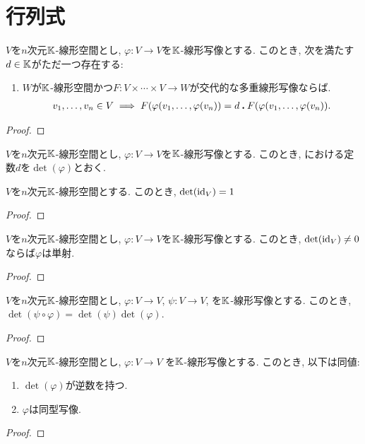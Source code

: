 \section{行列式}

\begin{prop}
  \label{thm:universalprop:det}
  $V$を$n$次元$\mathbb{K}$-線形空間とし,
  $\varphi\colon V \to V$を$\mathbb{K}$-線形写像とする.
  このとき, 次を満たす$d\in\mathbb{K}$がただ一つ存在する:
  \begin{enumerate}
  \item $W$が$\mathbb{K}$-線形空間かつ$F\colon V\times\cdots \times V\to W$が交代的な多重線形写像ならば.
    \begin{align*}
      v_1,\ldots, v_n \in V\implies F(\varphi(v_1,\ldots,\varphi(v_n))=d \mathbin{\boldsymbol{.}} F(\varphi(v_1,\ldots,\varphi(v_n)).
    \end{align*}
  \end{enumerate}
\end{prop}
\begin{proof}\end{proof}

\begin{definition}
  $V$を$n$次元$\mathbb{K}$-線形空間とし,
  $\varphi\colon V \to V$を$\mathbb{K}$-線形写像とする.
  このとき,
  における定数$d$を$\det(\varphi)$とおく.
\end{definition}

\begin{prop}
  $V$を$n$次元$\mathbb{K}$-線形空間とする.
  このとき, $\det(\operatorname{id}_V)=1$
\end{prop}
\begin{proof}\end{proof}

\begin{lemma}
  $V$を$n$次元$\mathbb{K}$-線形空間とし,
  $\varphi\colon V \to V$を$\mathbb{K}$-線形写像とする.
  このとき, $\det(\operatorname{id}_V)\neq 0$ならば$\varphi$は単射.
\end{lemma}
\begin{proof}\end{proof}


\begin{prop}
  $V$を$n$次元$\mathbb{K}$-線形空間とし,
  $\varphi\colon V \to V$,
  $\psi\colon V \to V$,
  を$\mathbb{K}$-線形写像とする.
  このとき,
  $\det(\psi\circ \varphi)=\det(\psi)\det(\varphi)$. 
\end{prop}
\begin{proof}\end{proof}

\begin{prop}
  $V$を$n$次元$\mathbb{K}$-線形空間とし,
  $\varphi\colon V \to V$
  を$\mathbb{K}$-線形写像とする.
  このとき,
  以下は同値:
  \begin{enumerate}
  \item $\det(\varphi)$が逆数を持つ.
  \item $\varphi$は同型写像.
  \end{enumerate}
\end{prop}
\begin{proof}\end{proof}



